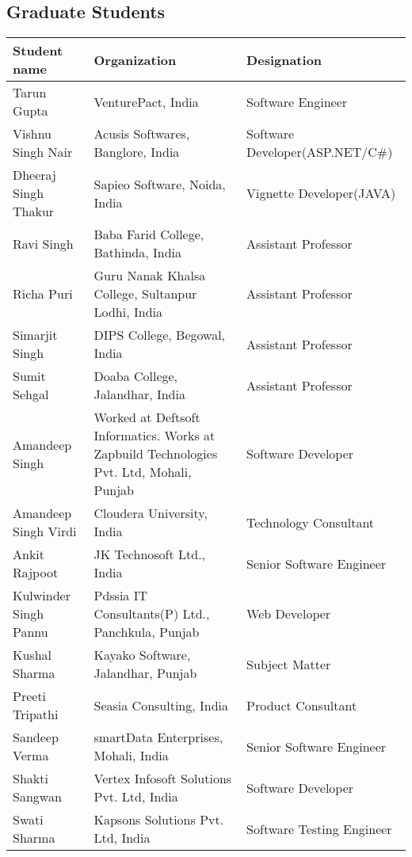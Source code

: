\documentclass[margin,line]{res}
\begin{document}
\begin{resume}
\section{\sc Graduate Students}
\begin{center}
    \begin{tabular}{ | p{3cm} | p{5.30cm} | l | }
    \hline
    \textbf{Student name} & \textbf{Organization} & \textbf{Designation}\\
    \hline
    Tarun Gupta & VenturePact, India & Software Engineer\\
    \hline
    Vishnu Singh Nair & Acusis Softwares, Banglore, India & Software Developer(ASP.NET/C\#)\\
    \hline
    Dheeraj Singh Thakur & Sapieo Software, Noida, India & Vignette Developer(JAVA)\\
    \hline
    Ravi Singh & Baba Farid College, Bathinda, India & Assistant Professor\\
    \hline
    Richa Puri & Guru Nanak Khalsa College, Sultanpur Lodhi, India & Assistant Professor\\
    \hline
	Simarjit Singh & DIPS College, Begowal, India & Assistant Professor\\
    \hline
    Sumit Sehgal & Doaba College, Jalandhar, India & Assistant Professor\\
    \hline
    Amandeep Singh & Worked at Deftsoft Informatics. Works at Zapbuild Technologies Pvt. Ltd, Mohali, Punjab & Software Developer\\
    \hline
    Amandeep Singh Virdi & Cloudera University, India & Technology Consultant\\
    \hline
    Ankit Rajpoot & JK Technosoft Ltd., India & Senior Software Engineer\\
    \hline
    Kulwinder Singh Pannu & Pdssia IT Consultants(P) Ltd., Panchkula, Punjab & Web Developer\\
    \hline
    Kushal Sharma & Kayako Software, Jalandhar, Punjab & Subject Matter\\
    \hline
    Preeti Tripathi & Seasia Consulting, India & Product Consultant\\
    \hline
    Sandeep Verma & smartData Enterprises, Mohali, India & Senior Software Engineer\\
    \hline
    Shakti Sangwan & Vertex Infosoft Solutions Pvt. Ltd, India & Software Developer\\
    \hline
	Swati Sharma & Kapsons Solutions Pvt. Ltd, India & Software Testing Engineer\\

\end{tabular}
\end{center}
\end{resume}
\end{document}
